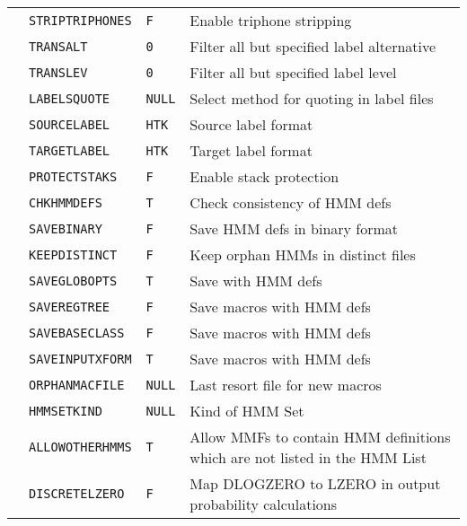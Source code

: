 \begin{center}
\begin{supertabular}{|p{1.4cm}|l|l|p{6.6cm}|}
  & \texttt{STRIPTRIPHONES} & \texttt{F} & Enable triphone stripping \\ 
  & \texttt{TRANSALT} & \texttt{0} & Filter all but specified label alternative \\ 
  & \texttt{TRANSLEV} & \texttt{0} & Filter all but specified label level \\ 
  & \texttt{LABELSQUOTE} & \texttt{NULL} & Select method for quoting in label files \\ 
  & \texttt{SOURCELABEL} & \texttt{HTK} & Source label format \\ 
  & \texttt{TARGETLABEL} & \texttt{HTK} & Target label format \\ \hline



 & \texttt{PROTECTSTAKS} & \texttt{F} & Enable stack protection \\ \hline


  & \texttt{CHKHMMDEFS} & \texttt{T} & Check consistency of HMM defs \\ 
  & \texttt{SAVEBINARY} & \texttt{F} & Save HMM defs in binary format \\ 
  & \texttt{KEEPDISTINCT} & \texttt{F} & Keep orphan HMMs in distinct files \\ 
  & \texttt{SAVEGLOBOPTS} & \texttt{T} & Save  with HMM defs \\ 
  & \texttt{SAVEREGTREE} & \texttt{F} & Save  macros with HMM defs \\ 
  & \texttt{SAVEBASECLASS} & \texttt{F} & Save  macros with HMM defs \\ 
  & \texttt{SAVEINPUTXFORM} & \texttt{T} & Save  macros with HMM defs \\ 
  & \texttt{ORPHANMACFILE} & \texttt{NULL} & Last resort file for new macros \\ 
  & \texttt{HMMSETKIND} & \texttt{NULL} & Kind of HMM Set \\ 
  & \texttt{ALLOWOTHERHMMS} & \texttt{T} & Allow MMFs to contain HMM definitions which are 
  not listed in the HMM List \\ 
  & \texttt{DISCRETELZERO}  & \texttt{F} & Map DLOGZERO to LZERO in output probability 
  calculations \\ \hline


\end{supertabular}
\end{center}
